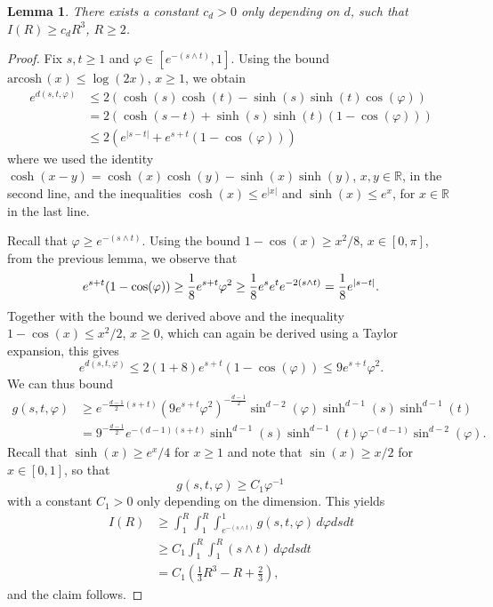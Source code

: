 \documentclass[11pt,a4paper]{article}
\theoremstyle{plain}
\newtheorem{lemma}[theorem]{Lemma}
\theoremstyle{definition}
\theoremstyle{remark}
\def\RR{\mathbb{R}}
\newcommand{\arcosh}{\mathrm{arcosh\,}}
\begin{document}
\begin{lemma}\label{lem:LowerBoundI}
    There exists a constant $c_d > 0$ only depending on $d$, such that $I(R) \geq c_d  R^3$, $R\geq 2$.
\end{lemma}
\begin{proof}
    Fix $s,t \geq 1$ and $\varphi \in [e^{-(s\wedge t)},1]$.
    Using the bound $\arcosh(x) \leq \log(2x)$, $x \geq 1$, we obtain
    \begin{align*}
    e^{d(s,t,\varphi)} 
    &\leq 2(\cosh(s)\cosh(t)-\sinh(s)\sinh(t)\cos(\varphi))\\
    &= 2(\cosh(s-t) + \sinh(s)\sinh(t)(1-\cos(\varphi)))\\
    &\leq 2(e^{|s-t|} + e^{s+t}(1-\cos(\varphi)))
    \end{align*}
    where we used the identity $\cosh(x-y) = \cosh(x)\cosh(y)-\sinh(x)\sinh(y)$, $x,y\in\RR$, in the second line, and the inequalities $\cosh(x) \leq e^{|x|}$ and $\sinh(x)\leq e^x$, for  $x \in \RR$  in the last line.
    
    Recall that $\varphi \geq e^{-(s\wedge t)}$.
    Using the bound $1-\cos(x) \geq x^2/8$, $x \in [0,\pi]$, from the previous lemma, we observe that
    \[ e^{s+t}(1-\cos(\varphi))
        \geq {1\over 8}e^{s+t} \varphi^2
        \geq {1\over 8}e^s e^t e^{-2(s\wedge t)}
        = {1\over 8}e^{|s-t|}. \]
    Together with the bound we derived above and the inequality $1-\cos(x) \leq x^2/2$, $x\geq 0$, which can again be derived using a Taylor expansion, this gives
    \[ e^{d(s,t,\varphi)}
    \leq 2(1+8) e^{s+t}(1-\cos(\varphi)) 
    \leq 9 e^{s+t} \varphi^2. \]
     We can thus bound 
    \begin{align*}
        g(s,t,\varphi)
        &\geq e^{-\frac{d-1}{2}(s+t)} (9 e^{s+t} \varphi^2)^{-\frac{d-1}{2}} \sin^{d-2}(\varphi)\sinh^{d-1}(s)\sinh^{d-1}(t)\\
        &= 9^{-\frac{d-1}{2}} e^{-(d-1)(s+t)} \sinh^{d-1}(s)\sinh^{d-1}(t) \varphi^{-(d-1)} \sin^{d-2}(\varphi).
    \end{align*}
Recall that $\sinh(x) \geq e^x/4$ for $x \geq 1$ and note that $\sin(x) \geq x/2$ for $x\in[0,1]$, so that 
    \[ g(s,t,\varphi) \geq C_1 \varphi^{-1}\, \]
    with a constant $C_1 > 0$ only depending on the dimension.
    This yields
    \begin{align*}
    I(R) 
    &\geq \int_1^R \int_1^R \int_{e^{-(s\wedge t)}}^1 g(s,t,\varphi) \,d\varphi ds dt\\
    &\geq C_1 \int_1^R \int_1^R (s \wedge t) \,d\varphi ds dt\\
    &= C_1 \left(\frac{1}{3} R^3 - R + \frac{2}{3} \right),
    \end{align*}
    and the claim follows.
\end{proof}
\end{document}
